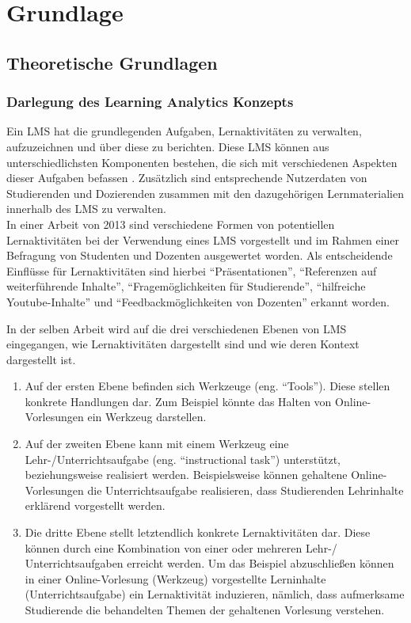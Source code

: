 \chapter{Grundlage} %

\section{Theoretische Grundlagen}

\subsection{Darlegung des Learning Analytics Konzepts}

Ein \ac{LMS} hat die grundlegenden Aufgaben, Lernaktivitäten zu verwalten, aufzuzeichnen und über diese zu berichten. Diese \ac{LMS} können aus unterschiedlichsten Komponenten bestehen, die sich mit verschiedenen Aspekten dieser Aufgaben befassen \autocite[S.1]{learningManagementSystemsFieldGuide}. Zusätzlich sind entsprechende Nutzerdaten von Studierenden und Dozierenden zusammen mit den dazugehörigen Lernmaterialien innerhalb des \ac{LMS} zu verwalten. \autocite{learningManagementSystemDefinition}\\
In einer Arbeit von 2013 \autocite[S.253]{SCHOONENBOOM2014247} sind verschiedene Formen von potentiellen Lernaktivitäten bei der Verwendung eines \ac{LMS} vorgestellt und im Rahmen einer Befragung von Studenten und Dozenten ausgewertet worden. Als entscheidende Einflüsse für Lernaktivitäten sind hierbei \enquote{Präsentationen}, \enquote{Referenzen auf weiterführende Inhalte}, \enquote{Fragemöglichkeiten für Studierende}, \enquote{hilfreiche Youtube-Inhalte} und \enquote{Feedbackmöglichkeiten von Dozenten} erkannt worden.

In der selben Arbeit \autocite[S.247]{SCHOONENBOOM2014247} wird auf die drei verschiedenen Ebenen von \ac{LMS} eingegangen, wie Lernaktivitäten dargestellt sind und wie deren Kontext dargestellt ist.
\begin{enumerate}
	\item Auf der ersten Ebene befinden sich Werkzeuge (eng. \enquote{Tools}). Diese stellen konkrete Handlungen dar. Zum Beispiel könnte das Halten von Online-Vorlesungen ein Werkzeug darstellen.
	\item Auf der zweiten Ebene kann mit einem Werkzeug eine Lehr-/Unterrichtsaufgabe (eng. \enquote{instructional task}) unterstützt, beziehungsweise realisiert werden. Beispielsweise können gehaltene Online-Vorlesungen die Unterrichtsaufgabe realisieren, dass Studierenden Lehrinhalte erklärend vorgestellt werden.
	\item Die dritte Ebene stellt letztendlich konkrete Lernaktivitäten dar. Diese können durch eine Kombination von einer oder mehreren Lehr-/ Unterrichtsaufgaben erreicht werden. Um das Beispiel abzuschließen können in einer Online-Vorlesung (Werkzeug) vorgestellte Lerninhalte (Unterrichtsaufgabe) ein Lernaktivität induzieren, nämlich, dass aufmerksame Studierende die behandelten Themen der gehaltenen Vorlesung verstehen.	
\end{enumerate}


